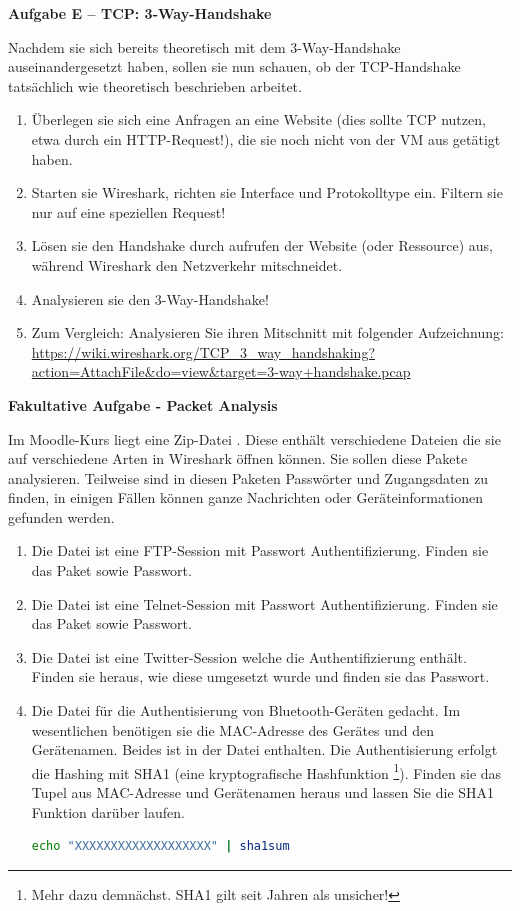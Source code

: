 \documentclass[paper=a4,fontsize=11pt]{scrartcl}%
\begin{document}
\begin{center}\Large{\textbf{Aufgabe E -- TCP: 3-Way-Handshake}}\end{center}\vskip0.2in
Nachdem sie sich bereits theoretisch mit dem 3-Way-Handshake auseinandergesetzt haben, sollen sie nun schauen, ob der TCP-Handshake tatsächlich wie theoretisch beschrieben arbeitet.
\begin{enumerate}
	\item Überlegen sie sich eine Anfragen an eine Website (dies sollte TCP nutzen, etwa durch ein HTTP-Request!), die sie noch nicht von der VM aus getätigt haben.
	\item Starten sie Wireshark, richten sie Interface und Protokolltype ein. Filtern sie nur auf eine speziellen Request!
	\item Lösen sie den Handshake durch aufrufen der Website (oder Ressource) aus, während Wireshark den Netzverkehr mitschneidet.
	\item Analysieren sie den 3-Way-Handshake!
	\item Zum Vergleich: Analysieren Sie ihren Mitschnitt mit folgender Aufzeichnung: \url{https://wiki.wireshark.org/TCP_3_way_handshaking?action=AttachFile&do=view&target=3-way+handshake.pcap}
\end{enumerate}

\begin{center}
\Large{\textbf{Fakultative Aufgabe - Packet Analysis}}
\end{center}\vskip0.25in

Im Moodle-Kurs liegt eine Zip-Datei . Diese enthält verschiedene Dateien die sie auf verschiedene Arten in Wireshark öffnen können. Sie sollen diese Pakete analysieren. Teilweise sind in diesen Paketen Passwörter und Zugangsdaten zu finden, in einigen Fällen können ganze Nachrichten oder Geräteinformationen gefunden werden.
\begin{enumerate}
	\item Die Datei  ist eine FTP-Session mit Passwort Authentifizierung. Finden sie das Paket sowie Passwort.
	\item Die Datei  ist eine Telnet-Session mit Passwort Authentifizierung. Finden sie das Paket sowie Passwort.
	\item Die Datei  ist eine Twitter-Session welche die Authentifizierung enthält. Finden sie heraus, wie diese umgesetzt wurde und finden sie das Passwort.
	\item Die Datei  für die Authentisierung von Bluetooth-Geräten gedacht. Im wesentlichen benötigen sie die MAC-Adresse des Gerätes und den Gerätenamen. Beides ist in der Datei enthalten. Die Authentisierung erfolgt die Hashing mit SHA1 (eine kryptografische Hashfunktion \footnote{Mehr dazu demnächst. SHA1 gilt seit Jahren als unsicher!}). Finden sie das Tupel aus MAC-Adresse und Gerätenamen heraus und lassen Sie die SHA1 Funktion darüber laufen.
	\begin{lstlisting}[style=Bash, language=Bash]
echo "XXXXXXXXXXXXXXXXXXX" | sha1sum
\end{lstlisting}
\end{enumerate}
\end{document}
